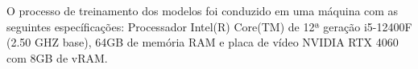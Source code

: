 
O processo de treinamento dos modelos foi conduzido em uma máquina com as seguintes específicações: Processador Intel(R)
Core(TM) de 12ª geração i5-12400F (2.50 GHZ base), 64GB de memória RAM e placa de vídeo NVIDIA RTX 4060 com 8GB de vRAM.